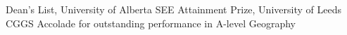 %
Dean's List, University of Alberta  \newline
SEE Attainment Prize, University of Leeds  \newline
CGGS Accolade for outstanding performance in A-level Geography 

\bigskip
